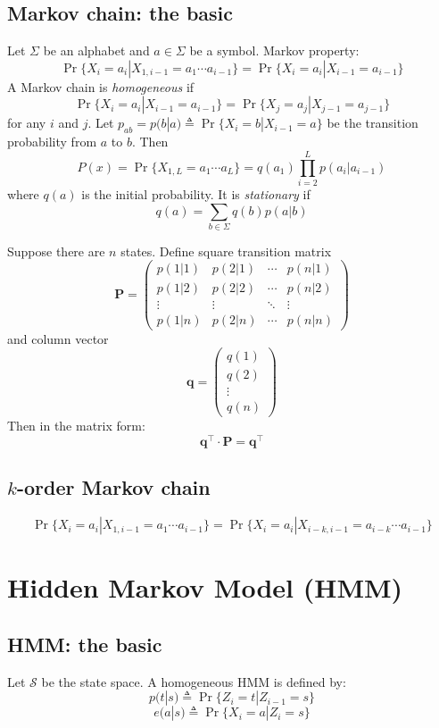 \documentclass[10pt]{article}
\begin{document}
\subsection{Markov chain: the basic}
Let $\Sigma$ be an alphabet and $a\in\Sigma$ be a symbol. Markov property:
$$
\Pr\{X_i=a_i|X_{1,i-1}=a_1\cdots a_{i-1}\}=\Pr\{X_i=a_i|X_{i-1}=a_{i-1}\}
$$
A Markov chain is \emph{homogeneous} if
$$
\Pr\{X_i=a_i|X_{i-1}=a_{i-1}\}=\Pr\{X_j=a_j|X_{j-1}=a_{j-1}\}
$$
for any $i$ and $j$. Let $p_{ab}=p(b|a)\triangleq\Pr\{X_i=b|X_{i-1}=a\}$ be the
transition probability from $a$ to $b$. Then
$$
P(x)=\Pr\{X_{1,L}=a_1\cdots a_L\}=q(a_1)\prod_{i=2}^Lp(a_i|a_{i-1})
$$
where $q(a)$ is the initial probability. It is \emph{stationary} if
$$
q(a)=\sum_{b\in\Sigma} q(b)p(a|b)
$$

Suppose there are $n$ states. Define square transition matrix
$$
\mathbf{P}=\left(\begin{array}{cccc}
p(1|1) & p(2|1) & \cdots & p(n|1) \\
p(1|2) & p(2|2) & \cdots & p(n|2) \\
\vdots & \vdots & \ddots & \vdots \\
p(1|n) & p(2|n) & \cdots & p(n|n)
\end{array}\right)
$$
and column vector
$$
\mathbf{q}=\left(\begin{array}{c}
q(1) \\
q(2) \\
\vdots\\
q(n)
\end{array}\right)
$$
Then in the matrix form:
$$
\mathbf{q}^\intercal\cdot\mathbf{P}=\mathbf{q}^\intercal
$$

\subsection{$k$-order Markov chain}
$$
\Pr\{X_i=a_i|X_{1,i-1}=a_1\cdots a_{i-1}\}=\Pr\{X_i=a_i|X_{i-k,i-1}=a_{i-k}\cdots a_{i-1}\}
$$

\section{Hidden Markov Model (HMM)}
\subsection{HMM: the basic}
Let $\mathcal{S}$ be the state space. A homogeneous HMM is defined by:
$$
p(t|s)\triangleq\Pr\{Z_i=t|Z_{i-1}=s\}
$$
$$
e(a|s)\triangleq\Pr\{X_i=a|Z_i=s\}
$$
\end{document}
